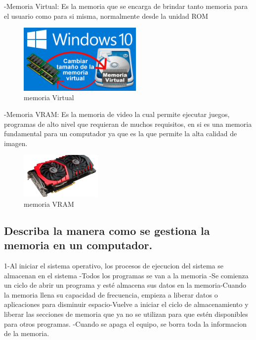 \documentclass{article}
\begin{document}
-Memoria Virtual: Es la memoria que se encarga de brindar tanto memoria para el usuario como para si misma, normalmente desde la unidad ROM \newline
\begin{figure}[h]
\includegraphics[width=6cm]{Virtual.png}
\centering
\caption{memoria Virtual}
\end{figure}

-Memoria VRAM: Es la memoria de video la cual permite ejecutar juegos, programas de alto nivel que requieran de muchos requisitos, en si es una memoria fundamental para un computador ya que es la que permite la alta calidad de imagen. \newline
\begin{figure}[h]
\includegraphics[width=4cm]{Vram.jpg}
\centering
\caption{memoria VRAM}
\end{figure}

\subsection{Describa la manera como se gestiona la memoria en un computador.}
1-Al iniciar el sistema operativo, los procesos de ejecucion del sistema se almacenan en el sistema -Todos los programas se van a la memoria -Se comienza un ciclo de abrir un programa y esté almacena sus datos en la memoria-Cuando la memoria llena su capacidad de frecuencia, empieza a liberar datos o aplicaciones para disminuir espacio-Vuelve a iniciar el ciclo de almacenamiento y liberar las secciones de memoria que ya no se utilizan para que estén disponibles para otros programas. -Cuando se apaga el equipo, se borra toda la informacion de la memoria.\newline
\end{document}
